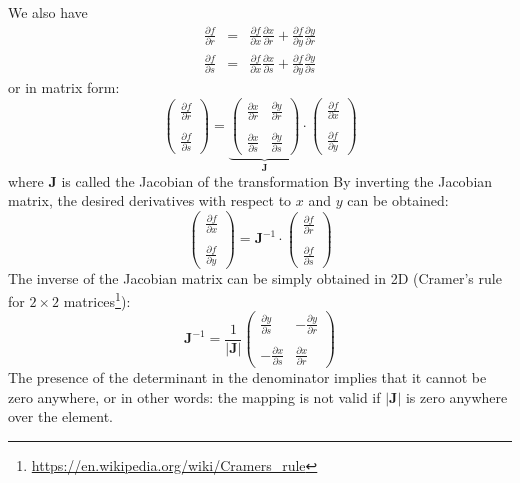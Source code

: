 We also have 
\begin{eqnarray}
\frac{\partial f}{\partial r} &=&
\frac{\partial f}{\partial x}\frac{\partial x}{\partial r}
+\frac{\partial f}{\partial y}\frac{\partial y}{\partial r} \\
\frac{\partial f}{\partial s} &=&
\frac{\partial f}{\partial x}\frac{\partial x}{\partial s}
+\frac{\partial f}{\partial y}\frac{\partial y}{\partial s}
\end{eqnarray}
or in matrix form:
\begin{equation}
\left(
\begin{array}{c}
\frac{\partial f}{\partial r} \\ \\
\frac{\partial f}{\partial s}
\end{array}
\right)
=
\underbrace{
\left(
\begin{array}{cc}
\frac{\partial x}{\partial r} & \frac{\partial y}{\partial r} \nonumber\\ \\
\frac{\partial x}{\partial s} & \frac{\partial y}{\partial s} \nonumber
\end{array}
\right)
}_{\bm J}
\cdot
\left(
\begin{array}{c}
\frac{\partial f}{\partial x} \\ \\
\frac{\partial f}{\partial y}
\end{array}
\right)
\end{equation}
where ${\bm J}$ is called the Jacobian of the transformation
By inverting the Jacobian matrix, the desired derivatives with respect to $x$
and $y$ can be obtained:
\[
\left(
\begin{array}{c}
\frac{\partial f}{\partial x} \\ \\
\frac{\partial f}{\partial y}
\end{array}
\right)
=
{\bm J}^{-1} \cdot 
\left(
\begin{array}{c}
\frac{\partial f}{\partial r} \\ \\
\frac{\partial f}{\partial s}
\end{array}
\right)
\]
The inverse of the Jacobian matrix can be simply obtained in 
2D (Cramer's rule for $2\times2$ matrices\footnote{\url{https://en.wikipedia.org/wiki/Cramers_rule}}):
\[
{\bm J}^{-1} = \frac{1}{|{\bm J}|} 
\left(
\begin{array}{cc}
\frac{\partial y}{\partial s} & -\frac{\partial y}{\partial r} \nonumber\\ \\
-\frac{\partial x}{\partial s} & \frac{\partial x}{\partial r} \nonumber
\end{array}
\right)
\]
The presence of the determinant in the denominator implies that it cannot 
be zero anywhere, or in other words: the mapping is not valid if $|{\bm J}|$
is zero anywhere over the element.


